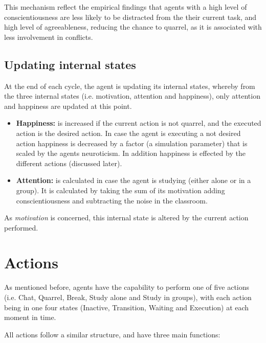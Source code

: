 \bb

This mechanism reflect the empirical findings that agents with a high level of
conscientiousness are less likely to be distracted from the their current task,
and high level of agreeableness, reducing the chance to quarrel, as it is associated
with less involvement in conflicts.

\subsection{Updating internal states}
At the end of each cycle, the agent is updating its internal states, whereby
from the three internal states (i.e. motivation, attention and happiness), only attention
and happiness are updated at this point.

\begin{itemize}
    \item \textbf{Happiness:} is increased if the current action is not quarrel,
    and the executed action is the desired action. In case the agent
    is executing a not desired action happiness is decreased by a factor (a
    simulation parameter) that is scaled by the agents neuroticism. In addition
    happiness is effected by the different actions (discussed later).
    \item \textbf{Attention:} is calculated in case the agent is studying (either
    alone or in a group). It is calculated by taking the sum of its motivation
    adding conscientiousness and subtracting the noise in the classroom.
\end{itemize}

As \textit{motivation} is concerned, this internal state is altered by the current action performed.

\section{Actions}
As mentioned before, agents have the capability to perform one of five actions (i.e.
Chat, Quarrel, Break, Study alone and Study in groups),
with each action being in one four states (Inactive, Transition, Waiting and Execution)
at each moment in time.

All actions follow a similar structure, and have three main functions:

